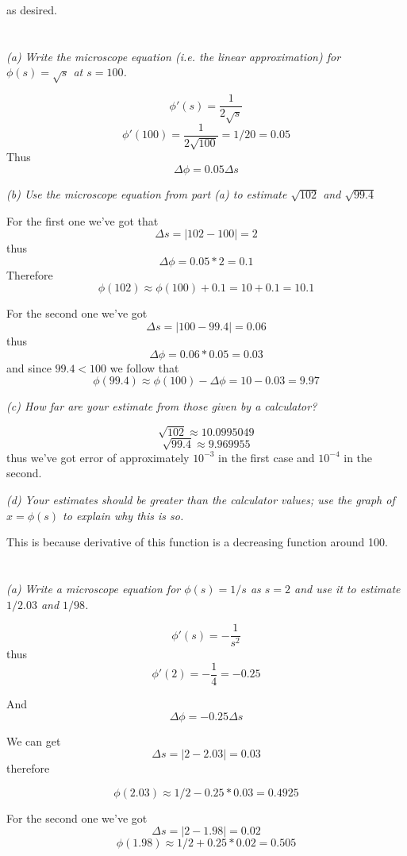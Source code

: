 \documentclass[11pt,oneside,titlepage]{book}
\begin{document}
as desired.

\section{}

\textit{(a) Write the microscope equation (i.e. the linear approximation) for
  $\phi(s) = \sqrt{s}$ at $s = 100$.}

$$\phi'(s) = \frac{1}{2 \sqrt{s}}$$
$$\phi'(100) = \frac{1}{2 \sqrt{100}} = 1/20 = 0.05$$
Thus
$$\Delta \phi = 0.05 \Delta s$$

\textit{(b) Use the microscope equation from part (a) to estimate $\sqrt{102}$ and $\sqrt{99.4}$}

For the first one we've got that
$$\Delta s = |102 - 100| = 2$$
thus
$$\Delta \phi = 0.05 * 2 = 0.1$$
Therefore
$$\phi(102) \approx \phi(100) + 0.1 = 10 + 0.1 = 10.1$$

For the second one we've got
$$\Delta s = |100 - 99.4| = 0.06$$
thus
$$\Delta \phi = 0.06 * 0.05 = 0.03$$
and since $99.4 < 100$ we follow that
$$\phi(99.4) \approx \phi(100) - \Delta \phi = 10 - 0.03 = 9.97$$

\textit{(c) How far are your estimate from those given by a calculator?}

$$\sqrt{102} \approx 10.0995049$$
$$\sqrt{99.4} \approx 9.969955$$
thus we've got  error of approximately $10^{-3}$ in the first case and $10^{-4}$ in the second.

\textit{(d) Your estimates should be greater than the calculator values; use the graph of
  $x = \phi(s)$ to explain why this is so.}

This is because derivative of this function is a  decreasing function around 100.

\section{}

\textit{(a) Write a microscope equation for $\phi(s) = 1/s$ as $s = 2$ and use it to estimate
  $1/2.03$ and $1/98$.}

$$\phi'(s) = -\frac{1}{s^2}$$
thus
$$\phi'(2) = -\frac{1}{4} = -0.25$$

And
$$\Delta \phi = -0.25 \Delta s$$

We can get
$$\Delta s = |2 - 2.03| = 0.03$$
therefore

$$\phi(2.03) \approx 1/2 - 0.25 * 0.03 = 0.4925$$

For the second one we've got
$$\Delta s = |2 - 1.98| = 0.02$$
$$\phi(1.98) \approx 1/2 + 0.25 * 0.02 = 0.505$$
\end{document}
